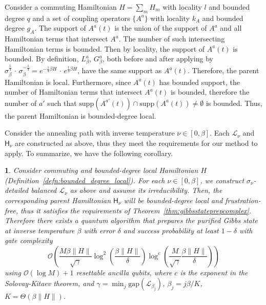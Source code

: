 \documentclass{article}
\theoremstyle{plain}
\theoremstyle{plain}
\theoremstyle{plain}
\theoremstyle{plain}
\theoremstyle{plain}
\theoremstyle{plain}
\newtheorem{cor}{\protect\corollaryname}
\theoremstyle{plain}
\providecommand{\corollaryname}{Corollary}
\newcommand{\norm}[1]{\lVert #1 \rVert}
\newcommand{\mathplaceholder}{\,\cdot\,}
\newcommand{\suppm}{\mathrm{supp}}
\newcommand{\calL}{\ensuremath{\mathcal{L}}}
\newcommand{\sfH}{\ensuremath{\mathsf{H}}}
\newcommand{\calO}{\ensuremath{\mathcal{O}}}
\begin{document}
Consider a commuting Hamiltonian $H = \sum_{m} H_m$ with locality $l$ and bounded degree $q$ and a set of coupling operators $\{A^a\}$ with locality $k_A$ and bounded degree $g_A$.
The support of $A^a(t)$ is the union of the support of $A^a$ and all Hamiltonian terms that intersect $A^a$. The number of such intersecting Hamiltonian terms is bounded. Then by locality, the support of $A^a(t)$ is bounded. By definition, $L^a_\beta$, $G^a_\beta$, both before and after applying by $\sigma_\beta^{\frac{1}{4}} \mathplaceholder \sigma_\beta^{-\frac{1}{4}} = e^{-\frac{1}{4}\beta H} \mathplaceholder e^{\frac{1}{4}\beta H}$,
have the same support as $A^a(t)$. Therefore, the parent Hamiltonian is local. Furthermore, since $A^a(t)$ has bounded support, the number of Hamiltonian terms that intersect $A^a(t)$ is bounded, therefore the number of $a'$ such that $\suppm(A^{a'}(t)) \cap \suppm( A^a(t) ) \neq \emptyset$ 
is bounded. Thus, the parent Hamiltonian is bounded-degree local.


Consider the annealing path with inverse temperature $\nu \in [0, \beta]$. Each $\calL_\nu$ and $\sfH_\nu$ are constructed as above, thus they meet the requirements for our method to apply. To summarize, we have the following corollary.

\begin{cor}
\label{cor:commuting}
    Consider commuting and bounded-degree local Hamiltonian $H$ (Definition~\ref{defn:bounded_degree_local}). For each $\nu\in [0, \beta]$, we construct $\sigma_\nu$-detailed balanced $\calL_\nu$ as above and assume its irreducibility. Then, the corresponding parent Hamiltonian $\sfH_\nu$ will be bounded-degree local and frustration-free, thus it satisfies the requirements of Theorem~\ref{thm:gibbsstateprepcomplex}. Therefore there exists a quantum algorithm that prepares the purified Gibbs state at inverse temperature $\beta$ with error $\delta$ and success probability at least $1-\delta$ with gate complexity
    \begin{equation}
        \calO \left( \frac{M\beta \norm{H}}{\sqrt{\gamma}} \log^2 \left(\frac{\beta\norm{H}}{\delta}\right) \log^c \left( \frac{M}{\sqrt{\gamma}} \frac{\beta\norm{H}}{\delta} 
        \right) \right)
    \end{equation} using $\calO (\log M) + 1$ resettable ancilla qubits, where $c$ is the exponent in the Solovay-Kitaev theorem, and $\gamma = \min_j \mathrm{gap}(\mathcal{L}_{\beta_j})$, $\beta_j = j\beta/K$, $K=\Theta(\beta\|H\|)$.
\end{cor}
\end{document}
